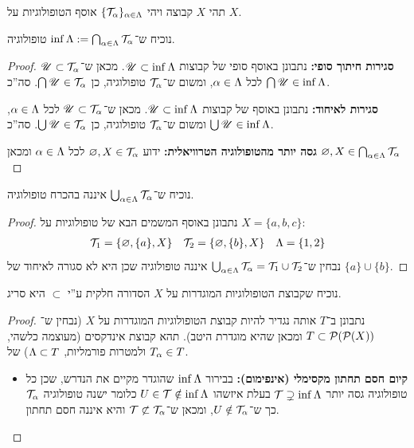 \documentclass[]{../../../../../tex/classes/homework}
\begin{document}
	\section{}
	תהי $X$ קבוצה ויהי $\{\mathcal{T}_\alpha\}_{\alpha \in \Lambda}$ אוסף הטופולוגיות על $X$. 
	\begin{enumerate}[(A)]
		\item נוכיח ש־$\inf \Lambda:= \bigcap_{\alpha \in \Lambda} \mathcal{T}_{\alpha}$ טופולוגיה. \begin{proof}
			\item \textbf{סגירות חיתוך סופי: }נתבונן באוסף סופי של קבוצות $\mathscr{U} \subset \inf \Lambda$. מכאן ש־$\mathscr{U} \subset \mathcal{T}_\alpha$ לכל $\alpha \in \Lambda$, ומשום ש־$\mathcal{T}_\alpha$ טופולוגיה, כן $\bigcap \mathscr{U} \in \mathcal{T}_\alpha$. סה''כ $\bigcap \mathscr{U}\in \inf \Lambda$. 
			\item \textbf{סגירות לאיחוד: }נתבונן באוסף של קבוצות $\mathscr{U} \subset \inf \Lambda$. מכאן ש־$\mathscr{U} \subset \mathcal{T}_\alpha$ לכל $\alpha \in \Lambda$, ומשום ש־$\mathcal{T}_\alpha$ טופולוגיה, כן $\bigcup \mathscr{U} \in \mathcal{T}_\alpha$. סה''כ $\bigcup \mathscr{U}\in \inf \Lambda$. 
			\item \textbf{גסה יותר מהטופולוגיה הטרוויאלית: }ידוע $\varnothing, X \in \mathcal{T}_\alpha$ לכל $\alpha \in \Lambda$ ומכאן $\varnothing, X \in \bigcap_{\alpha \in \Lambda} \mathcal{T}_{\alpha}$
		\end{proof}
		\item נוכיח ש־$\bigcup_{\alpha \in \Lambda}\mathcal{T}_\alpha$ איננה בהכרח טופולוגיה. \begin{proof}
			נתבונן באוסף המשמים הבא של טופולוגיות על $X = \{a, b, c\}$: 
			\begin{align*}
				\mathcal{T}_1 = \{\varnothing, \{a\}, X\} && \mathcal{T}_2 = \{\varnothing, \{b\}, X\} && \Lambda = \{1, 2\}
			\end{align*}
			נבחין ש־$\bigcup_{\alpha \in \Lambda}\mathcal{T}_\alpha = \mathcal{T}_1 \cup \mathcal{T}_2$ איננה טופולוגיה שכן היא לא סגורה לאיחוד של $\{a\} \cup \{b\}$. 
		\end{proof}
		\item[(ג+ד)]נוכיח שקבוצת הטופולוגיות המוגדרות על $X$ הסדורה חלקית ע''י $\subset$ היא סריג. 
		\begin{proof}נתבונן ב־$T$ אותה נגדיר להיות קבוצת הטופולוגיות המוגדרות על $X$ (נבחין ש־$T \subset \mathcal{P}(\mathcal{P}(X))$ ומכאן שהיא מוגדרת היטב). תהא קבוצת אינדקסים (מעוצמה כלשהי, ולמטרות פורמליות, $\Lambda \subset T$) של $T_\alpha \in T$. 
			\begin{itemize}
				\item \textbf{קיום חסם תחתון מקסימלי (אינפימום): }בבירור $\inf \Lambda$ שהוגדר מקיים את הנדרש, שכן כל טופולוגיה גסה יותר $\mathcal{T} \supsetneq \inf \Lambda$ בעלת איזשהו $U \in \mathcal{T}\notin \inf \Lambda$ כלומר ישנה טופולוגיה $\mathcal{T}_\alpha$ כך ש־$U \notin \mathcal{T}_\alpha$, ומכאן ש־$\mathcal{T} \not\subset \mathcal{T}_\alpha$ והיא איננה חסם תחתון. 

\end{itemize}
\end{proof}
\end{enumerate}
\end{document}
